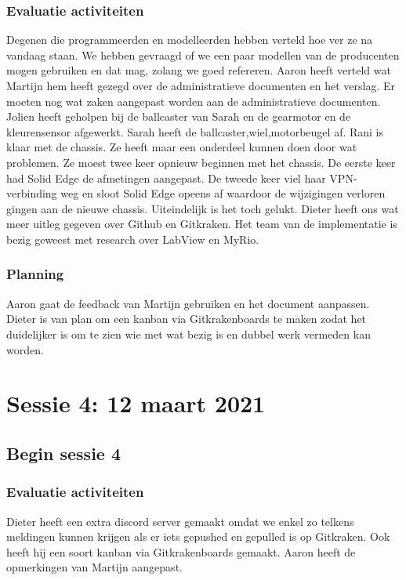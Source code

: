 \documentclass[a4paper,twoside,kulak]{kulakreport} %
\begin{document}
\subsection{Evaluatie activiteiten}
Degenen die programmeerden en modelleerden hebben verteld hoe ver ze na vandaag staan. We hebben gevraagd of we een paar modellen van de producenten mogen gebruiken en dat mag, zolang we goed refereren. Aaron heeft verteld wat Martijn hem heeft gezegd over de administratieve documenten en het verslag. Er moeten nog wat zaken aangepast worden aan de administratieve documenten. Jolien heeft geholpen bij de ballcaster van Sarah en de gearmotor en de kleurensensor afgewerkt. Sarah heeft de ballcaster,wiel,motorbeugel af. Rani is klaar met de chassis. Ze heeft maar een onderdeel kunnen doen door wat problemen. Ze moest twee keer opnieuw beginnen met het chassis. De eerste keer had Solid Edge de afmetingen aangepast. De tweede keer viel haar VPN-verbinding weg en sloot Solid Edge opeens af waardoor de wijzigingen verloren gingen aan de nieuwe chassis. Uiteindelijk is het toch gelukt. Dieter heeft ons wat meer uitleg gegeven over Github en Gitkraken. Het team van de implementatie is bezig geweest met research over LabView en MyRio.

\subsection{Planning}
Aaron gaat de feedback van Martijn gebruiken en het document aanpassen. Dieter is van plan om een kanban via Gitkrakenboards te maken zodat het duidelijker is om te zien wie met wat bezig is en dubbel werk vermeden kan worden.
 

\chapter{Sessie 4: 12 maart 2021}
\section{Begin sessie 4}
\subsection{Evaluatie activiteiten}
Dieter heeft een extra discord server gemaakt omdat we enkel zo telkens meldingen kunnen krijgen als er iets gepushed en gepulled is op Gitkraken. Ook heeft hij een soort kanban via Gitkrakenboards gemaakt. Aaron heeft de opmerkingen van Martijn aangepast.
\end{document}

